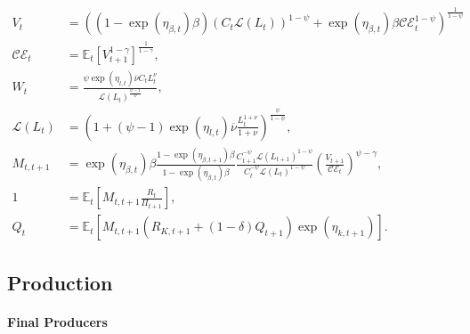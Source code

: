 \documentclass[12 pt, oneside]{article}
\theoremstyle{definition}
\theoremstyle{definition}
\theoremstyle{definition}
\newcommand{\E}{\mathbb{E}}
\newcommand{\calC}{\mathcal{C}}
\newcommand{\calE}{\mathcal{E}}
\newcommand{\calL}{\mathcal{L}}
\begin{document}
\begin{align}
  \label{eq:epstein zin recursion}
  V_t & = \left((1 - \exp(\eta_{\beta, t})\beta) (C_t\calL(L_t))^{1 - \psi} + \exp(\eta_{\beta, t})\beta \calC\calE_t^{1 - \psi}\right)^{\frac{1}{1 - \psi}}\\
  \calC\calE_t & = \E_t[V_{t + 1}^{1 - \gamma}]^{\frac{1}{1 - \gamma}},\\
  \label{eq:intratemporal consumption labor}
  W_t & = \frac{\psi \exp(\eta_{l, t})\overline{\nu} C_t L_t^\nu}{\calL(L_t)^{\frac{\psi - 1}{\psi}}},\\
  \label{eq:labor disutility function}
  \calL(L_t) & = \left(1 + (\psi - 1)\exp(\eta_{l, t})\overline{\nu}\frac{L_t^{1 + \nu}}{1 + \nu}\right)^{\frac{\psi}{1-\psi}},\\
  \label{eq:stochastic discount factor}
  M_{t, t + 1} & = \exp(\eta_{\beta, t})\beta\frac{1 - \exp(\eta_{\beta, t + 1})\beta}{1 - \exp(\eta_{\beta, t})\beta}\frac{C_{t + 1}^{-\psi}\calL(L_{t + 1})^{1 - \psi}}{C_t^{-\psi}\calL(L_t)^{1 - \psi}}\left(\frac{V_{t + 1}}{\calC\calE_t}\right)^{\psi - \gamma},\\
  \label{eq:euler eqn}
  1 & = \E_t\left[M_{t, t + 1}\frac{R_t}{\Pi_{t + 1}}\right],\\
  \label{eq:capital asset pricing}
  Q_t & = \E_t\left[M_{t, t + 1} \left(R_{K, t + 1} + (1 - \delta)Q_{t + 1}\right)\exp(\eta_{k, t + 1})\right].
\end{align}




\subsection{Production}

\paragraph{Final Producers}
\end{document}

